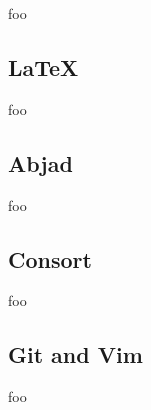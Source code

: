 foo

\subsection{LaTeX}

foo

\subsection{Abjad}

foo

\subsection{Consort}

foo

\subsection{Git and Vim}

foo